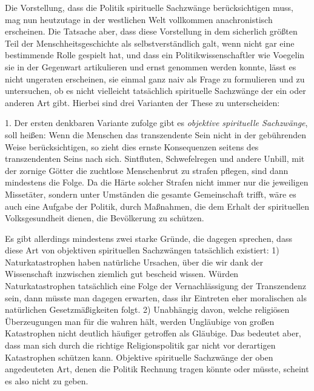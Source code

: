 Die Vorstellung, dass die Politik spirituelle Sachzwänge berücksichtigen muss,
mag nun heutzutage in der westlichen Welt vollkommen anachronistisch
erscheinen. Die Tatsache aber, dass diese Vorstellung in dem sicherlich
größten Teil der Menschheitsgeschichte als selbstverständlich galt, wenn nicht
gar eine bestimmende Rolle gespielt hat, und dass ein Politikwissenschaftler
wie Voegelin sie in der Gegenwart artikulieren und ernst genommen werden
konnte, lässt es nicht ungeraten erscheinen, sie einmal ganz naiv als Frage zu
formulieren und zu untersuchen, ob es nicht vielleicht tatsächlich spirituelle
Sachzwänge der ein oder anderen Art gibt. Hierbei sind drei Varianten der
These zu unterscheiden:

1. Der ersten denkbaren Variante zufolge gibt es {\em objektive spirituelle
  Sachzwänge}, soll heißen: Wenn die Menschen das transzendente Sein nicht in
der gebührenden Weise berücksichtigen, so zieht dies ernste Konsequenzen
seitens des transzendenten Seins nach sich. Sintfluten, Schwefelregen und
andere Unbill, mit der zornige Götter die zuchtlose Menschenbrut zu strafen
pflegen, sind dann mindestens die Folge. Da die Härte solcher Strafen nicht
immer nur die jeweiligen Missetäter, sondern unter Umständen die gesamte
Gemeinschaft trifft, wäre es auch eine Aufgabe der Politik, durch Maßnahmen,
die dem Erhalt der spirituellen Volksgesundheit dienen, die Bevölkerung zu
schützen.

Es gibt allerdings mindestens zwei starke Gründe, die dagegen sprechen, dass
diese Art von objektiven spirituellen Sachzwängen tatsächlich existiert: 1)
Naturkatastrophen haben natürliche Ursachen, über die wir dank der
Wissenschaft inzwischen ziemlich gut bescheid wissen. Würden Naturkatastrophen
tatsächlich eine Folge der Vernachlässigung der Transzendenz sein, dann müsste
man dagegen erwarten, dass ihr Eintreten eher moralischen als natürlichen
Gesetzmäßigkeiten folgt. 2) Unabhängig davon, welche religiösen Überzeugungen
man für die wahren hält, werden Ungläubige von großen Katastrophen nicht
deutlich häufiger getroffen als Gläubige. Das bedeutet aber, dass man sich
durch die richtige Religionspolitik gar nicht vor derartigen Katastrophen
schützen kann. Objektive spirituelle Sachzwänge der oben angedeuteten Art,
denen die Politik Rechnung tragen könnte oder müsste, scheint es also nicht zu
geben.

